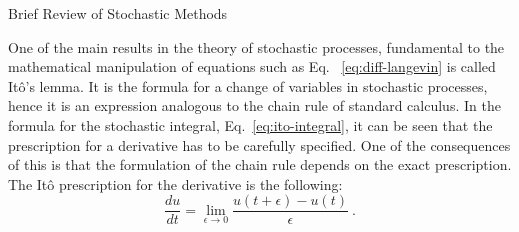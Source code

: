 \begin{chapter}{Brief Review of Stochastic Methods}


One of the main results in the theory of stochastic processes,
fundamental to the mathematical manipulation of
equations such as Eq.~ \eqref{eq:diff-langevin} is called
Itô's lemma. It is the formula for a change of variables in stochastic processes,
hence it is an expression analogous to the chain rule of
standard calculus.
In the formula for the stochastic integral, Eq.~\eqref{eq:ito-integral},
it can be seen
that the prescription for a derivative has to be carefully
specified. One of the consequences of this is that the
formulation of the chain rule depends on the exact prescription.
The Itô prescription for the derivative is the following:
\begin{equation}
\frac{du}{dt} = \lim_{\epsilon \to 0} \frac{u(t+\epsilon) - u(t)}{\epsilon} \ .
\end{equation}


\end{chapter}
